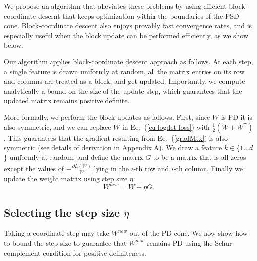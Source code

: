 \documentclass{article} %
\newcommand\mat[1]{{#1}}
\renewcommand\vec[1]{\mathbf{#1}}
\newcommand{\T}{{}^\mathsf{T}}
\newcommand{\W}{\mat{W}}
\newcommand{\newW}{{\mat{W^{new}}}}
\newcommand{\tL}{\tilde{L}(\W)}
\newcommand{\ignore}[1]{}
\newcommand{\grd}{\frac{\partial \tL}{\W}}
\renewcommand{\eqref}[1]{Eq.~(\ref{#1})}
\begin{document}
We propose an algorithm that alleviates these problems by using efficient block-coordinate descent that keeps optimization within the boundaries of the PSD cone.
Block-coordinate descent also enjoys provably fast convergence rates, and is especially useful when the block update can be performed efficiently, as we show below.

Our algorithm applies block-coordinate descent approach as follows.
At each step, a single feature is drawn uniformly at random, all the matrix entries on its row and columns are treated as a block, and get updated. Importantly, we compute analytically a bound on the size of the update step, which guarantees that the updated matrix remains positive definite.

More formally, we perform the block updates as follows. First, since $\W$ is PD it is also symmetric, and we can replace $\W$ in \eqref{eq-logdet-loss} with $\tfrac{1}{2}(\W + \W\T)$. This guarantees that the gradient resulting from \eqref{gradMtx} is also symmetric (see details of derivation in Appendix A). We draw a feature $k \in \{1 \ldots d$\} uniformly at random, and define the matrix $G$ to be a matrix that is all zeros except the values of $-\grd$ lying in the $i$-th row and $i$-th column. Finally we update the weight matrix using step size $\eta$:
\begin{equation}
    \newW = \W +\eta G.
\label{updateEq}
\end{equation}

\ignore{
Since PD matrices are symmetric, we require the update $\mat{G}$ of \eqref{updateEq} to be symmetric:
\begin{equation}
  \mat{G} = \vec{u}\cdot\vec{e_k}\T + \vec{e_k}\cdot\vec{u}\T
  \label{gradMtx}
\end{equation}
where $\vec{u}$ is a column vector that equals the column $k$ of the
(symmetric) gradient matrix of the objective \eqref{gradMtx},
$\vec{e_k}$ equals an elementary vector for selecting a column $k$ of
a matrix.
}

\subsection{Selecting the step size $\eta$}\label{subsec:step}
Taking a coordinate step may take $\newW$ out of the PD cone. We now show how to bound the step size to guarantee that $\newW$ remains PD using the Schur complement condition for positive definiteness.
\end{document}
